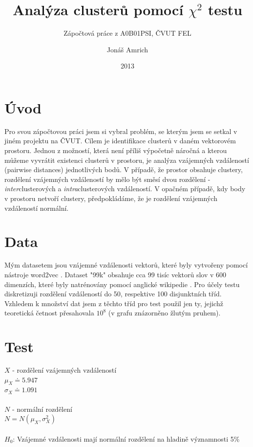 \documentclass[fleqn,11pt]{article}
\title{Analýza clusterů pomocí $\chi^2$ testu}
\subtitle{Zápočtová práce z A0B01PSI, ČVUT FEL}
\author{Jonáš Amrich}
\date{2013}
\begin{document}
    \maketitle
    \section{Úvod}
    Pro svou zápočtovou práci jsem si vybral problém, se kterým jsem se setkal v jiném projektu na ČVUT. Cílem je identifikace clusterů v daném vektorovém prostoru. Jednou z možností, která není příliš výpočetně náročná a kterou můžeme vyvrátit existenci clusterů v prostoru, je analýza vzájemných vzdáleností (pairwise distances) jednotlivých bodů. V případě, že prostor obsahuje clustery, rozdělení vzájemných vzdáleností by mělo být směsí dvou rozdělení - \textit{inter}clusterových a \textit{intra}clusterových vzdáleností. V opačném případě, kdy body v prostoru netvoří clustery, předpokládáme, že je rozdělení vzájemných vzdáleností normální.

    \section{Data}
    Mým datasetem jsou vzájemné vzdálenosti vektorů, které byly vytvořeny pomocí nástroje word2vec \cite{mikolov2013efficient}. Dataset "99k" obsahuje cca 99 tisíc vektorů slov v 600 dimenzích, které byly natrénovány pomocí anglické wikipedie \cite{wiki}.
    Pro účely testu diskretizuji rozdělení vzdáleností do 50, respektive 100 disjunktních tříd. Vzhledem k množství dat jsem z těchto tříd pro test použil jen ty, jejichž teoretická četnost přesahovala $10^8$ (v grafu znázorněno žlutým pruhem).

    \section{Test}

    $X$ - rozdělení vzájemných vzdáleností\\
    $\mu_X \doteq 5.947$\\
    $\sigma_X \doteq 1.091$\\
    \\
    $N$ - normální rozdělení\\
    $N = N(\mu_X, \sigma_X^2)$\\
    \\
    $H_0$: Vzájemné vzdálenosti mají normální rozdělení na hladině významnosti 5\%\\
\end{document}
